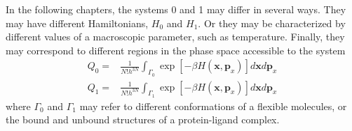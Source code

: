 In the following chapters, the systems 0 and 1 may differ in several ways. They may have different Hamiltonians, $H_0$ and $H_1$. Or they may be characterized by different values of a macroscopic parameter, such as temperature. Finally, they may correspond to different regions in the phase space accessible to the system
\begin{align}
Q_0=&\frac{1}{N!h^{3N}}\int_{\Gamma_0}\exp{\left[-\beta H(\mathbf{x},\mathbf{p}_x)\right]}d\mathbf{x}d\mathbf{p}_x\\
Q_1=&\frac{1}{N!h^{3N}}\int_{\Gamma_1}\exp{\left[-\beta H(\mathbf{x},\mathbf{p}_x)\right]}d\mathbf{x}d\mathbf{p}_x
\end{align}
where $\Gamma_0$ and $\Gamma_1$ may refer to different conformations of a flexible molecules, or the bound and unbound structures of a protein-ligand complex.

